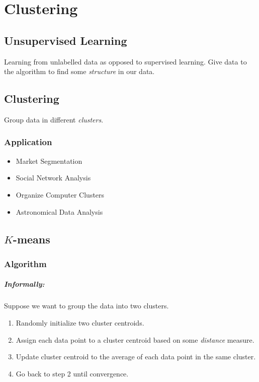 \chapter{Clustering}
\section{Unsupervised Learning}
Learning from unlabelled data as opposed to supervised learning. Give data to the algorithm
to find some \emph{structure} in our data.

\section{Clustering}
Group data in different \emph{clusters}.

\subsection{Application}
\begin{itemize}
	\item Market Segmentation
	\item Social Network Analysis
	\item Organize Computer Clusters
	\item Astronomical Data Analysis
\end{itemize}

\section{$K$-means}
\subsection{Algorithm}
\paragraph{Informally:}
Suppose we want to group the data into two clusters.
\begin{enumerate}
	\item Randomly initialize two cluster centroids.
	\item Assign each data point to a cluster centroid based on some \emph{distance}
	      measure.
	\item Update cluster centroid to the average of each data point in the same
	      cluster.
	\item Go back to step 2 until convergence.
\end{enumerate}

